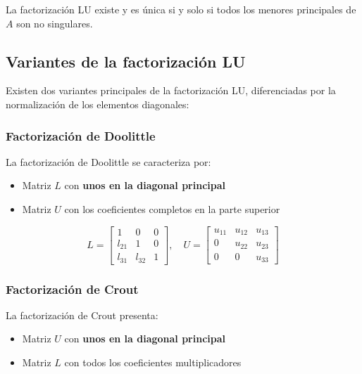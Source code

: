 	La factorización LU existe y es única si y solo si todos los menores principales de $A$ son no singulares.

\subsection{Variantes de la factorización LU}

Existen dos variantes principales de la factorización LU, diferenciadas por la normalización de los elementos diagonales:

\subsubsection{Factorización de Doolittle}

La factorización de Doolittle se caracteriza por:

\begin{itemize}
	\item Matriz $L$ con \textbf{unos en la diagonal principal}
	\item Matriz $U$ con los coeficientes completos en la parte superior
\end{itemize}

\[
L = \begin{bmatrix}
	1 & 0 & 0 \\
	l_{21} & 1 & 0 \\
	l_{31} & l_{32} & 1
\end{bmatrix}, \quad
U = \begin{bmatrix}
	u_{11} & u_{12} & u_{13} \\
	0 & u_{22} & u_{23} \\
	0 & 0 & u_{33}
\end{bmatrix}
\]

\subsubsection{Factorización de Crout}

La factorización de Crout presenta:

\begin{itemize}
	\item Matriz $U$ con \textbf{unos en la diagonal principal}
	\item Matriz $L$ con todos los coeficientes multiplicadores
\end{itemize}

